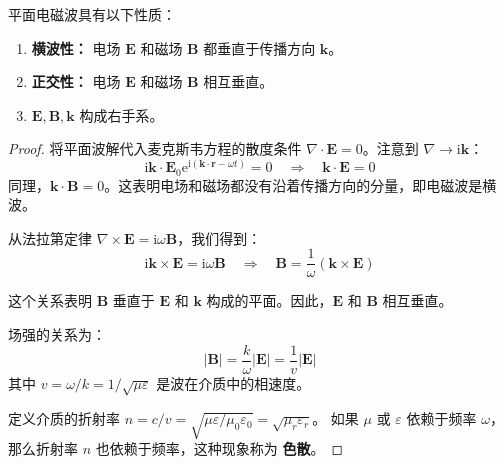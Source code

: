 \documentclass[fontset=none]{ctexart}
\begin{document}
\begin{corollary}[平面电磁波的性质]
平面电磁波具有以下性质：
\begin{enumerate}
    \item \textbf{横波性：} 电场 $\bm{E}$ 和磁场 $\bm{B}$ 都垂直于传播方向 $\bm{k}$。
    \item \textbf{正交性：} 电场 $\bm{E}$ 和磁场 $\bm{B}$ 相互垂直。
    \item $\bm{E}, \bm{B}, \bm{k}$ 构成右手系。
\end{enumerate}
\end{corollary}
\begin{proof}
将平面波解代入麦克斯韦方程的散度条件 $\nabla \cdot \bm{E}=0$。注意到 $\nabla \to \mathrm{i}\bm{k}$：
\begin{equation}
\mathrm{i}\bm{k} \cdot \bm{E}_0 \mathrm{e}^{\mathrm{i}(\bm{k} \cdot \bm{r} - \omega t)} 
= 0 \quad \Rightarrow \quad \bm{k} \cdot \bm{E} = 0
\end{equation}
同理，$\bm{k} \cdot \bm{B} = 0$。这表明电场和磁场都没有沿着传播方向的分量，即电磁波是横波。

从法拉第定律 $\nabla \times \bm{E} = \mathrm{i}\omega\bm{B}$，我们得到：
\begin{equation}
\mathrm{i}\bm{k} \times \bm{E} = \mathrm{i}\omega\bm{B} \quad \Rightarrow \quad \bm{B} 
= \frac{1}{\omega}(\bm{k} \times \bm{E})
\end{equation}

这个关系表明 $\bm{B}$ 垂直于 $\bm{E}$ 和 $\bm{k}$ 构成的平面。因此，$\bm{E}$ 和 $\bm{B}$ 相互垂直。

场强的关系为：
\begin{equation}
|\bm{B}| = \frac{k}{\omega} |\bm{E}| = \frac{1}{v} |\bm{E}|
\end{equation}
其中 $v = \omega/k = 1/\sqrt{\mu\varepsilon}$ 是波在介质中的相速度。

定义介质的折射率 $n = c/v = \sqrt{\mu\varepsilon/\mu_0\varepsilon_0} = \sqrt{\mu_r \varepsilon_r}$。
如果 $\mu$ 或 $\varepsilon$ 依赖于频率 $\omega$，那么折射率 $n$ 也依赖于频率，这种现象称为 \textbf{色散}。
\end{proof}
\end{document}
